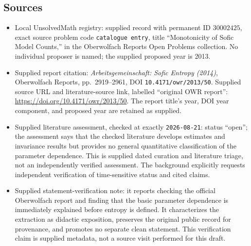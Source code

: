 \documentclass[11pt]{article}
\begin{document}
\subsection{Sources}
\begin{itemize}
\item Local UnsolvedMath registry: supplied record with permanent ID \(30002425\), exact source problem code \texttt{catalogue entry}, title ``Monotonicity of Sofic Model Counts,'' in the Oberwolfach Reports Open Problems collection. No individual proposer is named; the supplied proposed year is 2013.
\item Supplied report citation: \emph{Arbeitsgemeinschaft: Sofic Entropy (2014)}, Oberwolfach Reports, pp.~2919--2961, DOI \texttt{10.4171/owr/2013/50}. Supplied source URL and literature-source link, labelled ``original OWR report'': \url{https://doi.org/10.4171/owr/2013/50}. The report title's year, DOI year component, and proposed year are retained as supplied.
\item Supplied literature assessment, checked at exactly \texttt{2026-08-21}: status ``open''; the assessment says that the checked literature develops estimates and invariance results but provides no general quantitative classification of the parameter dependence. This is supplied dated curation and literature triage, not an independently verified assessment. The background explicitly requests independent verification of time-sensitive status and cited claims.
\item Supplied statement-verification note: it reports checking the official Oberwolfach report and finding that the basic parameter dependence is immediately explained before entropy is defined. It characterizes the extraction as didactic exposition, preserves the original public record for provenance, and promotes no separate clean statement. This verification claim is supplied metadata, not a source visit performed for this draft.
\end{itemize}
\end{document}
